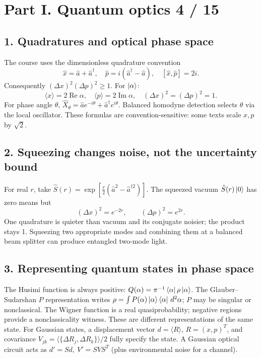 
\section*{Part I. Quantum optics \hfill 4 / 15}
\subsection*{1. Quadratures and optical phase space}
The course uses the dimensionless quadrature convention
\[
\boxed{\hat x=\hat a+\hat a^\dagger,\quad
\hat p=i(\hat a^\dagger-\hat a),\quad [\hat x,\hat p]=2i.}
\]
Consequently \((\Delta x)^2(\Delta p)^2\ge1\).
For \(\left\lvert \alpha\right\rangle\):
\[
\langle x\rangle=2\operatorname{Re}\alpha,\quad
\langle p\rangle=2\operatorname{Im}\alpha,\quad
(\Delta x)^2=(\Delta p)^2=1.
\]
For phase angle \(\theta\),
\(\hat X_\theta=\hat a e^{-i\theta}+\hat a^\dagger e^{i\theta}\).
Balanced homodyne detection selects \(\theta\) via the local oscillator.
These formulas are convention-sensitive: some texts scale \(x,p\)
by \(\sqrt2\).

\subsection*{2. Squeezing changes noise, not the uncertainty bound}
For real \(r\), take
\(\hat S(r)=\exp[\frac r2(\hat a^2-\hat a^{\dagger2})]\).
The squeezed vacuum \(\hat S(r)\left\lvert 0\right\rangle\) has zero means but
\[
\boxed{(\Delta x)^2=e^{-2r},\qquad
(\Delta p)^2=e^{2r}.}
\]
One quadrature is quieter than vacuum and its conjugate noisier;
the product stays 1. Squeezing two appropriate modes and combining
them at a balanced beam splitter can produce entangled two-mode light.

\subsection*{3. Representing quantum states in phase space}
The Husimi function is always positive:
\(Q(\alpha)=\pi^{-1}\left\langle \alpha\right\rvert\rho\left\lvert \alpha\right\rangle\).
The Glauber--Sudarshan \(P\) representation writes
\(\rho=\int P(\alpha)\left\lvert \alpha\right\rangle\left\langle \alpha\right\rvert\,d^2\alpha\);
\(P\) may be singular or nonclassical. The Wigner function is a
real quasiprobability; negative regions provide a nonclassicality
witness. These are different representations of the same state.
For Gaussian states, a displacement vector
\(d=\langle R\rangle\), \(R=(x,p)^T\), and covariance
\(V_{jk}=\langle\{\Delta R_j,\Delta R_k\}\rangle/2\)
fully specify the state. A Gaussian optical circuit acts as
\(d'=Sd,\ V'=SVS^T\) (plus environmental noise for a channel).

